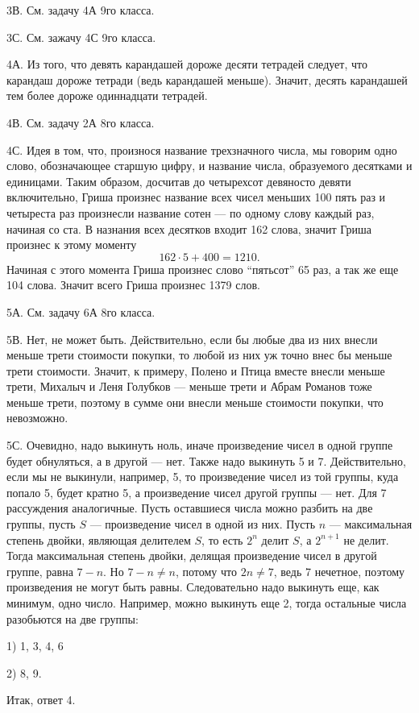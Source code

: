 \documentclass[12pt]{amsart}
\theoremstyle{definition}
\theoremstyle{remark}
\theoremstyle{plain}
\begin{document}
3В. См. задачу 4А 9го класса.

3С. См. зажачу 4С 9го класса.

4А. Из того, что девять карандашей дороже десяти тетрадей следует, что карандаш дороже тетради (ведь карандашей меньше). Значит, десять карандашей тем более дороже одиннадцати тетрадей.

4В. См. задачу 2А 8го класса.

4С. Идея в том, что, произнося название трехзначного числа, мы говорим одно слово, обозначающее старшую цифру, и название числа, образуемого десятками и единицами. Таким образом, досчитав до четырехсот девяносто девяти включительно, Гриша произнес название всех чисел меньших 100 пять раз и четыреста раз произнесли название сотен --- по одному слову каждый раз, начиная со ста. В назнания всех десятков входит 162 слова, значит Гриша произнес к этому моменту
$$
162\cdot 5+400=1210.
$$
Начиная с этого момента Гриша произнес слово "`пятьсот"' 65 раз, а так же еще 104 слова. Значит всего Гриша произнес 1379 слов.

5А. См. задачу 6А 8го класса.

5В. Нет, не может быть. Действительно, если бы любые два из них внесли меньше трети стоимости покупки, то любой из них уж точно внес бы меньше трети стоимости. Значит, к примеру, Полено и Птица вместе внесли меньше трети, Михалыч и Леня Голубков --- меньше трети и Абрам Романов тоже меньше трети, поэтому в сумме они внесли меньше стоимости покупки, что невозможно.

5С. Очевидно, надо выкинуть ноль, иначе произведение чисел в одной группе будет обнуляться, а в другой --- нет. Также надо выкинуть 5 и 7. Действительно, если мы не выкинули, например, 5, то произведение чисел из той группы, куда попало 5, будет кратно 5, а произведение чисел другой группы --- нет. Для 7 рассуждения аналогичные. Пусть оставшиеся числа можно разбить на две группы, пусть $S$ --- произведение чисел в одной из них. Пусть $n$ --- максимальная степень двойки, являющая делителем $S$, то есть $2^n$ делит $S$, а $2^{n+1}$ не делит. Тогда максимальная степень двойки, делящая произведение чисел в другой группе, равна $7-n$. Но $7-n\neq n$, потому что $2n\neq 7$, ведь 7 нечетное, поэтому произведения не могут быть равны. Следовательно надо выкинуть еще, как минимум, одно число. Например, можно выкинуть еще 2, тогда остальные числа разобьются на две группы:

1) 1, 3, 4, 6

2) 8, 9.

Итак, ответ 4.
\end{document}
